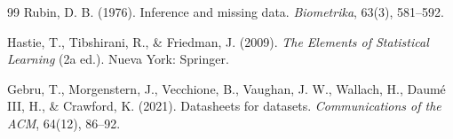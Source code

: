 \documentclass[11pt, a4paper]{article}
\begin{document}
\begin{thebibliography}{99}
 Rubin, D. B. (1976). Inference and missing data. \textit{Biometrika}, 63(3),
581--592.

 Hastie, T., Tibshirani, R., \& Friedman, J. (2009). \textit{The Elements of
Statistical Learning} (2a ed.). Nueva York: Springer.

 Gebru, T., Morgenstern, J., Vecchione, B., Vaughan, J. W., Wallach, H.,
Daumé III, H., \& Crawford, K. (2021). Datasheets for datasets. \textit{Communications of the ACM},
64(12), 86--92.

\end{thebibliography}
\end{document}
